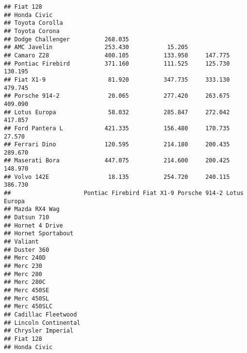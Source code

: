 \documentclass[]{book}
\begin{document}
\begin{verbatim}
## Fiat 128                                                                 
## Honda Civic                                                              
## Toyota Corolla                                                           
## Toyota Corona                                                            
## Dodge Challenger          268.035                                        
## AMC Javelin               253.430           15.205                       
## Camaro Z28                400.105          133.950     147.775           
## Pontiac Firebird          371.160          111.525     125.730    130.195
## Fiat X1-9                  81.920          347.735     333.130    479.745
## Porsche 914-2              20.065          277.420     263.675    409.090
## Lotus Europa               58.032          285.847     272.042    417.857
## Ford Pantera L            421.335          156.480     170.735     27.570
## Ferrari Dino              120.595          214.180     200.435    289.670
## Maserati Bora             447.075          214.600     200.425    148.970
## Volvo 142E                 18.135          254.720     240.115    386.730
##                     Pontiac Firebird Fiat X1-9 Porsche 914-2 Lotus Europa
## Mazda RX4 Wag                                                            
## Datsun 710                                                               
## Hornet 4 Drive                                                           
## Hornet Sportabout                                                        
## Valiant                                                                  
## Duster 360                                                               
## Merc 240D                                                                
## Merc 230                                                                 
## Merc 280                                                                 
## Merc 280C                                                                
## Merc 450SE                                                               
## Merc 450SL                                                               
## Merc 450SLC                                                              
## Cadillac Fleetwood                                                       
## Lincoln Continental                                                      
## Chrysler Imperial                                                        
## Fiat 128                                                                 
## Honda Civic                                                              

\end{verbatim}
\end{document}
